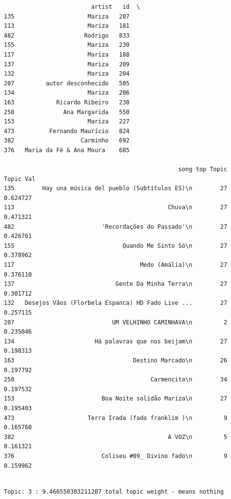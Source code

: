 \documentclass[11pt]{article}
\begin{document}
    
    \begin{verbatim}
                         artist   id  \
135                     Mariza   207   
113                     Mariza   181   
482                    Rodrigo   833   
155                     Mariza   230   
117                     Mariza   188   
137                     Mariza   209   
132                     Mariza   204   
207         autor desconhecido   505   
134                     Mariza   206   
163            Ricardo Ribeiro   238   
250              Ana Margarida   550   
153                     Mariza   227   
473          Fernando Maurício   824   
382                   Carminho   692   
376   Maria da Fé & Ana Moura    685   

                                                  song top Topic  Topic Val  
135        Hay una música del pueblo (Subtítulos ES)\n        27   0.624727  
113                                            Chuva\n        27   0.471321  
482                         'Recordações do Passado'\n        27   0.426761  
155                               Quando Me Sinto Só\n        27   0.378962  
117                                    Medo (Amália)\n        27   0.376110  
137                             Gente Da Minha Terra\n        27   0.301712  
132   Desejos Vãos (Florbela Espanca) HD Fado Live ...        27   0.257115  
207                            UM VELHINHO CAMINHAVA\n         2   0.235046  
134                       Há palavras que nos beijam\n        27   0.198313  
163                                  Destino Marcado\n        26   0.197792  
250                                       Carmencita\n        34   0.197532  
153                         Boa Noite solidão Mariza\n        27   0.195403  
473                     Terra Irada (fado franklim )\n         9   0.165760  
382                                            A VOZ\n         5   0.161321  
376                         Coliseu #09_ Divino fado\n         9   0.159962  
    \end{verbatim}

    
    \begin{Verbatim}[commandchars=\\\{\}]

Topic: 3 : 9.466550303211207 total topic weight - means nothing

    \end{Verbatim}
\end{document}
